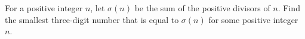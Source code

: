 For a positive integer $n$, let $\sigma(n)$ be the sum of the positive divisors of $n$. Find the smallest three-digit number that is equal to $\sigma(n)$ for some positive integer $n$.
